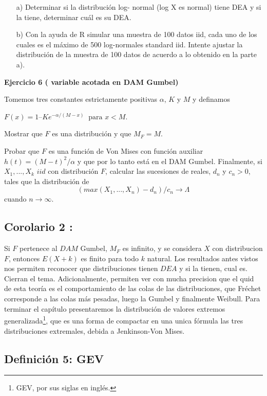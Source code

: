 \documentclass[
  oneside]{book}
\begin{document}
\begin{itemize}
\item[a)] Determinar si la distribución log- normal (log X es normal) tiene DEA y si la tiene, determinar cuál es su DEA. 
\item[b)] Con la ayuda de R simular una muestra de 100 datos iid, cada uno de los cuales es el máximo de 500 log-normales standard iid. Intente ajustar la distribución de la muestra de 100 datos de acuerdo a lo obtenido en la parte a).
\end{itemize}

\textbf{Ejercicio 6 ( variable acotada en DAM Gumbel) }

Tomemos tres constantes estrictamente positivas \(\alpha\), \(K\) y
\(M\) y definamos

\(F(x)= 1 – K e^{-α/(M-x)}\:\text{ para }x<M.\)

Mostrar que \(F\) es una distribución y que \(M_F= M\).

Probar que \(F\) es una función de Von Mises con función auxiliar
\(h(t)= (M-t)^2/ \alpha\) y que por lo tanto está en el DAM Gumbel.
Finalmente, si \(X_1,...,X_k\) \(iid\) con distribución \(F\), calcular
las sucesiones de reales, \(d_n\) y \(c_n>0\), tales que la distribución
de \[(max(X_1,...,X_n)- d_n)/c_n \longrightarrow \Lambda\] cuando
\(n\longrightarrow \infty\).

\hypertarget{corolario-2}{%
\subsection{Corolario 2 :}\label{corolario-2}}

Si \(F\) pertenece al \(DAM\) Gumbel, \(M_F\) es infinito, y se
considera \(X\) con distribucion \(F\), entonces \(E(X+k)\) es finito
para todo \(k\) natural. Los resultados antes vistos nos permiten
reconocer que distribuciones tienen \(DEA\) y si la tienen, cual es.
Cierran el tema. Adicionalmente, permiten ver con mucha precision que el
quid de esta teoría es el comportamiento de las colas de las
distribuciones, que Fréchet corresponde a las colas más pesadas, luego
la Gumbel y finalmente Weibull. Para terminar el capítulo presentaremos
la distribución de valores extremos
generalizada\footnote{GEV, por sus siglas en inglés.}, que es una forma
de compactar en una unica fórmula las tres distribuciones extremales,
debida a Jenkinson-Von Mises.

\hypertarget{definiciuxf3n-5-gev}{%
\subsection{Definición 5: GEV}\label{definiciuxf3n-5-gev}}
\end{document}
